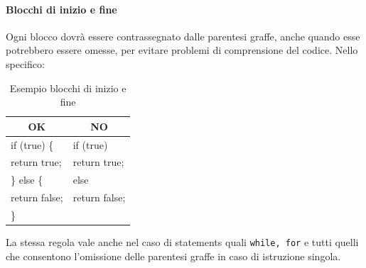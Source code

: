 \paragraph{Blocchi di inizio e fine}
Ogni blocco dovrà essere contrassegnato dalle parentesi graffe, anche quando esse potrebbero essere omesse, per evitare problemi di comprensione del codice. Nello specifico:
\begin{table} [H]
	\begin{center}
		\begin{tabular}{ | l | l |}
			\multicolumn{1}{c}{\textbf{OK}}&\multicolumn{1}{c}{\textbf{NO}}\\ 
			\hline
			if (true) \{ 			   &  if (true)\\
			\hspace{0.5cm}return true;          & \hspace{0.5cm}return true;\\
			\} else \{ 					& else\\
			\hspace{0.5cm}return false;          & \hspace{0.5cm}return false;\\
			\}								& \\
			\hline
		\end{tabular}
	\end{center}
	\caption{Esempio blocchi di inizio e fine}
\end{table}
La stessa regola vale anche nel caso di statements quali \texttt{while, for} e tutti quelli che consentono l’omissione delle parentesi graffe in caso di istruzione singola.
